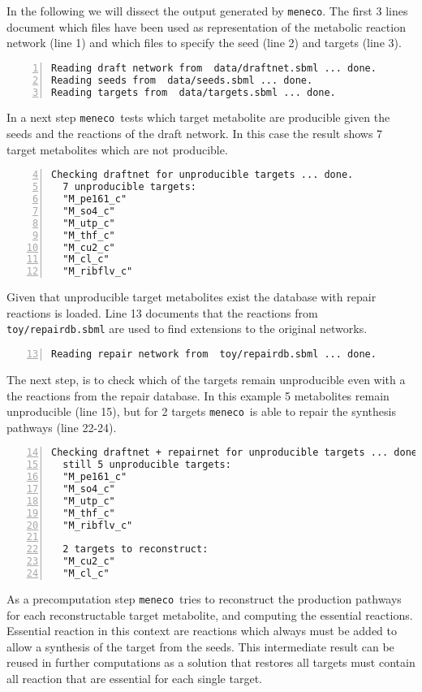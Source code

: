 \documentclass{article}
\newcommand\meneco{\texttt{meneco}}
\begin{document}
In the following we will dissect the output generated by \meneco.
The first 3 lines document which files have been used as representation of the metabolic reaction network (line 1)
and which files to specify the seed (line 2) and targets (line 3).
\begin{Verbatim}[frame=single,numbers=left]
Reading draft network from  data/draftnet.sbml ... done.
Reading seeds from  data/seeds.sbml ... done.
Reading targets from  data/targets.sbml ... done.
\end{Verbatim}
In a next step \meneco\ tests which target metabolite are producible given the seeds and the reactions of the draft network.
In this case the result shows 7 target metabolites which are not producible.
\begin{Verbatim}[frame=single,numbers=left,firstnumber=4]
Checking draftnet for unproducible targets ... done.
  7 unproducible targets:
  "M_pe161_c"
  "M_so4_c"
  "M_utp_c"
  "M_thf_c"
  "M_cu2_c"
  "M_cl_c"
  "M_ribflv_c"
\end{Verbatim}
Given that unproducible target metabolites exist the database with repair reactions is loaded.
Line 13 documents that the reactions from \verb|toy/repairdb.sbml| are used to find extensions to the original networks.
\begin{Verbatim}[frame=single,numbers=left,firstnumber=13]
Reading repair network from  toy/repairdb.sbml ... done.
\end{Verbatim}
The next step, is to check which of the targets remain unproducible even with a the reactions from the repair database.
In this example 5 metabolites remain unproducible (line 15),
but for 2 targets \meneco\ is able to repair the synthesis pathways (line 22-24).
\begin{Verbatim}[frame=single,numbers=left,firstnumber=14]
Checking draftnet + repairnet for unproducible targets ... done.
  still 5 unproducible targets:
  "M_pe161_c"
  "M_so4_c"
  "M_utp_c"
  "M_thf_c"
  "M_ribflv_c"

  2 targets to reconstruct:
  "M_cu2_c"
  "M_cl_c"
\end{Verbatim}
As a precomputation step \meneco\ tries to reconstruct the production pathways for each reconstructable target metabolite,
and computing the essential reactions.
Essential reaction in this context are reactions which always must be added to allow a synthesis of the target from the seeds.
This intermediate result can be reused in further computations as a solution that restores all targets must contain all reaction that are essential for each single target.
\end{document}
